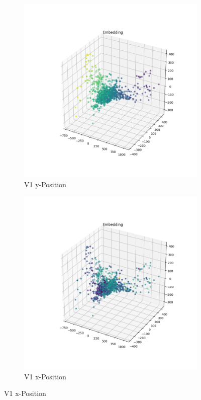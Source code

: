 \begin{figure}[h]
	\centering
	
	\begin{subfigure}[c]{0.49\textwidth}			
		\includegraphics[width=1\textwidth,center]{bilder/Hauptteil/MT_Grapple/EMB_alle/1_Embedding_y.png}
		\caption{V1 y-Position}
		\label{img:Einbettung1_y}	
	\end{subfigure}
	\centering
	\begin{subfigure}[c]{0.49\textwidth}			
		\includegraphics[width=1\textwidth,center]{bilder/Hauptteil/MT_Grapple/EMB_alle/1_Embedding_x.png}
		\caption{V1 x-Position}
		\label{img:Einbettung1_x}		
	\end{subfigure}
	

\end{figure}
